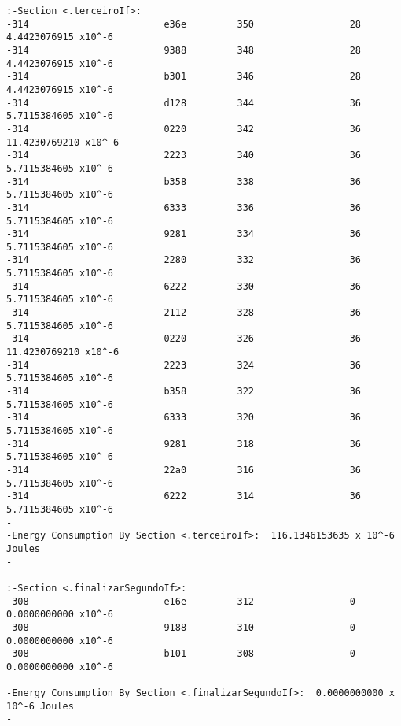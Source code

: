 \begin{verbatim}
:-Section <.terceiroIf>:  
-314                        e36e         350                 28              4.4423076915 x10^-6 
-314                        9388         348                 28              4.4423076915 x10^-6 
-314                        b301         346                 28              4.4423076915 x10^-6 
-314                        d128         344                 36              5.7115384605 x10^-6 
-314                        0220         342                 36              11.4230769210 x10^-6 
-314                        2223         340                 36              5.7115384605 x10^-6 
-314                        b358         338                 36              5.7115384605 x10^-6 
-314                        6333         336                 36              5.7115384605 x10^-6 
-314                        9281         334                 36              5.7115384605 x10^-6 
-314                        2280         332                 36              5.7115384605 x10^-6 
-314                        6222         330                 36              5.7115384605 x10^-6 
-314                        2112         328                 36              5.7115384605 x10^-6 
-314                        0220         326                 36              11.4230769210 x10^-6 
-314                        2223         324                 36              5.7115384605 x10^-6 
-314                        b358         322                 36              5.7115384605 x10^-6 
-314                        6333         320                 36              5.7115384605 x10^-6 
-314                        9281         318                 36              5.7115384605 x10^-6 
-314                        22a0         316                 36              5.7115384605 x10^-6 
-314                        6222         314                 36              5.7115384605 x10^-6 
-                                                                                          
-Energy Consumption By Section <.terceiroIf>:  116.1346153635 x 10^-6 Joules
-                                                                                          

:-Section <.finalizarSegundoIf>:  
-308                        e16e         312                 0              0.0000000000 x10^-6 
-308                        9188         310                 0              0.0000000000 x10^-6 
-308                        b101         308                 0              0.0000000000 x10^-6 
-                                                                                          
-Energy Consumption By Section <.finalizarSegundoIf>:  0.0000000000 x 10^-6 Joules
-                                                                                          


\end{verbatim}
